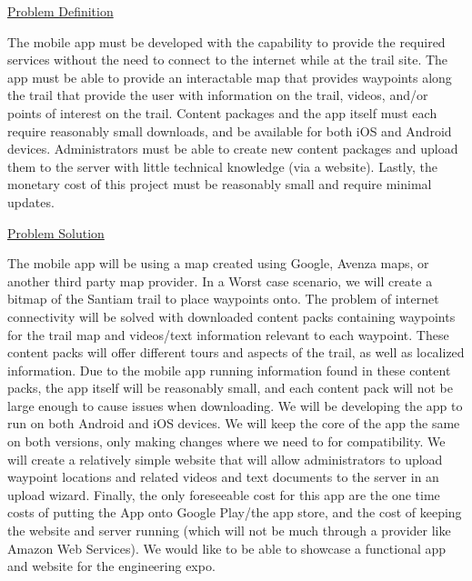 \documentclass[letterpaper,10pt,titlepage]{article}
\begin{document}
\begin{center}
\underline{Problem Definition}\\
\vspace{0.3cm}
\end{center}

The mobile app must be developed with the capability to provide the required services without the need to connect to the internet while at the trail site. The app must be able to provide an interactable map that provides waypoints along the trail that provide the user with information on the trail, videos, and/or points of interest on the trail. Content packages and the app itself must each require reasonably small downloads, and be available for both iOS and Android devices. Administrators must be able to create new content packages and upload them to the server with little technical knowledge (via a website). Lastly, the monetary cost of this project must be reasonably small and require minimal updates.\\
\vspace{1.5cm}


\begin{center}
\underline{Problem Solution}\\
\vspace{0.3cm}
\end{center}

The mobile app will be using a map created using Google, Avenza maps, or another third party map provider. In a Worst case scenario, we will create a bitmap of the Santiam trail to place waypoints onto. The problem of internet connectivity will be solved with downloaded content packs containing waypoints for the trail map and videos/text information relevant to each waypoint. These content packs will offer different tours and aspects of the trail, as well as localized information. Due to the mobile app running information found in these content packs, the app itself will be reasonably small, and each content pack will not be large enough to cause issues when downloading. We will be developing the app to run on both Android and iOS devices. We will keep the core of the app the same on both versions, only making changes where we need to for compatibility. We will create a relatively simple website that will allow administrators to upload waypoint locations and related videos and text documents to the server in an upload wizard. Finally, the only foreseeable cost for this app are the one time costs of putting the App onto Google Play/the app store, and the cost of keeping the website and server running (which will not be much through a provider like Amazon Web Services). We would like to be able to showcase a functional app and website for the engineering expo. \\
\vspace{1.5cm}
\end{document}
